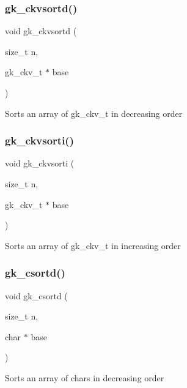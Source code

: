 \subsubsection{\texorpdfstring{gk\+\_\+ckvsortd()}{gk\_ckvsortd()}}
{\footnotesize\ttfamily void gk\+\_\+ckvsortd (\begin{DoxyParamCaption}\item[{size\+\_\+t}]{n,  }\item[{gk\+\_\+ckv\+\_\+t $\ast$}]{base }\end{DoxyParamCaption})}

Sorts an array of gk\+\_\+ckv\+\_\+t in decreasing order \mbox{\label{a00140_a174146fc7e90c9afe88d792377916db6}} 
\subsubsection{\texorpdfstring{gk\+\_\+ckvsorti()}{gk\_ckvsorti()}}
{\footnotesize\ttfamily void gk\+\_\+ckvsorti (\begin{DoxyParamCaption}\item[{size\+\_\+t}]{n,  }\item[{gk\+\_\+ckv\+\_\+t $\ast$}]{base }\end{DoxyParamCaption})}

Sorts an array of gk\+\_\+ckv\+\_\+t in increasing order \mbox{\label{a00140_a0dd4b6ef6aa36734ad488d600e46aa57}} 
\subsubsection{\texorpdfstring{gk\+\_\+csortd()}{gk\_csortd()}}
{\footnotesize\ttfamily void gk\+\_\+csortd (\begin{DoxyParamCaption}\item[{size\+\_\+t}]{n,  }\item[{char $\ast$}]{base }\end{DoxyParamCaption})}

Sorts an array of chars in decreasing order \mbox{\label{a00140_a4e3b58cec06398521af35dc21642c97d}} 
